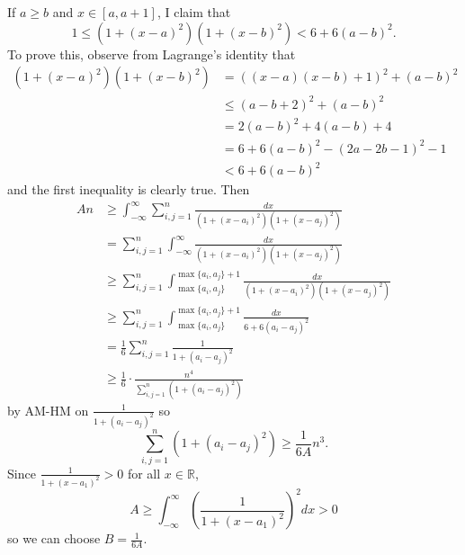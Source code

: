 If $a\geq b$ and $x\in[a,a+1]$, I claim that
\[
	1\leq(1+(x-a)^2)(1+(x-b)^2)<6+6(a-b)^2.
\]
To prove this, observe from Lagrange's identity that
\begin{align*}
	(1+(x-a)^2)(1+(x-b)^2) &= ((x-a)(x-b)+1)^2+(a-b)^2 \\
	&\leq (a-b+2)^2 + (a-b)^2 \\
	&= 2(a-b)^2+4(a-b)+4 \\
	&= 6+6(a-b)^2-(2a-2b-1)^2-1 \\
	&< 6+6(a-b)^2
\end{align*}
and the first inequality is clearly true. Then
\begin{align*}
	An &\geq \int_{-\infty}^{\infty}\sum_{i,j=1}^n \frac{dx}{(1+(x-a_i)^2)(1+(x-a_j)^2)} \\
	&= \sum_{i,j=1}^n\int_{-\infty}^{\infty} \frac{dx}{(1+(x-a_i)^2)(1+(x-a_j)^2)} \\
	&\geq \sum_{i,j=1}^n\int_{\max\{a_i,a_j\}}^{\max\{a_i,a_j\}+1} \frac{dx}{(1+(x-a_i)^2)(1+(x-a_j)^2)} \\
	&\geq \sum_{i,j=1}^n\int_{\max\{a_i,a_j\}}^{\max\{a_i,a_j\}+1} \frac{dx}{6+6(a_i-a_j)^2} \\
	&= \frac{1}{6} \sum_{i,j=1}^n \frac{1}{1+(a_i-a_j)^2} \\
	&\geq \frac{1}{6}\cdot\frac{n^4}{\sum_{i,j=1}^n (1+(a_i-a_j)^2)}
\end{align*}
by AM-HM on $\frac{1}{1+(a_i-a_j)^2}$ so
\[
	\sum_{i,j=1}^n (1+(a_i-a_j)^2) \geq \frac{1}{6A}n^3.
\]
Since $\frac{1}{1+(x-a_1)^2}>0$ for all $x\in\mathbb{R}$,
\[
	A \geq \int_{-\infty}^{\infty} \left(\frac{1}{1+(x-a_1)^2}\right)^2 dx>0
\]
so we can choose $B=\frac{1}{6A}$.